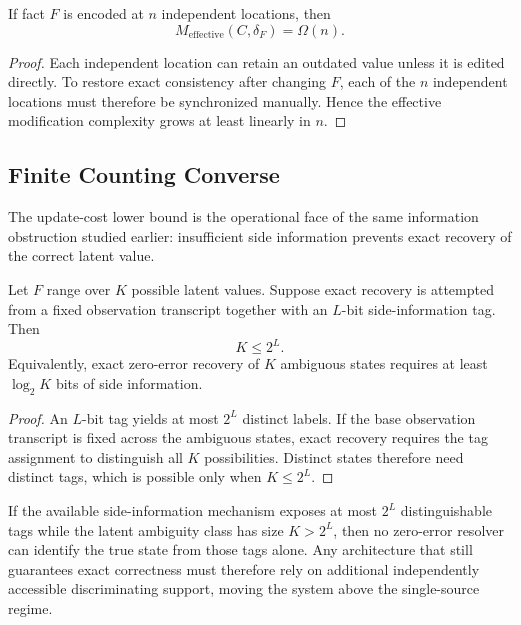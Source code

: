 \begin{theorem}\label{thm:lower-bound}
If fact $F$ is encoded at $n$ independent locations, then
\[
M_{\mathrm{effective}}(C,\delta_F)=\Omega(n).
\]
\end{theorem}

\begin{proof}
Each independent location can retain an outdated value unless it is edited directly. To restore exact consistency after changing $F$, each of the $n$ independent locations must therefore be synchronized manually. Hence the effective modification complexity grows at least linearly in $n$.
\end{proof}

\subsection{Finite Counting Converse}\label{sec:info-converse}

The update-cost lower bound is the operational face of the same information obstruction studied earlier: insufficient side information prevents exact recovery of the correct latent value.

\begin{theorem}\label{thm:fano-converse}
Let $F$ range over $K$ possible latent values. Suppose exact recovery is attempted from a fixed observation transcript together with an $L$-bit side-information tag. Then
\[
K \le 2^L.
\]
Equivalently, exact zero-error recovery of $K$ ambiguous states requires at least $\log_2 K$ bits of side information.
\end{theorem}

\begin{proof}
An $L$-bit tag yields at most $2^L$ distinct labels. If the base observation transcript is fixed across the ambiguous states, exact recovery requires the tag assignment to distinguish all $K$ possibilities. Distinct states therefore need distinct tags, which is possible only when $K\le 2^L$.
\end{proof}

\begin{lemma}\label{lem:info-dof}
If the available side-information mechanism exposes at most $2^L$ distinguishable tags while the latent ambiguity class has size $K>2^L$, then no zero-error resolver can identify the true state from those tags alone. Any architecture that still guarantees exact correctness must therefore rely on additional independently accessible discriminating support, moving the system above the single-source regime.
\end{lemma}

